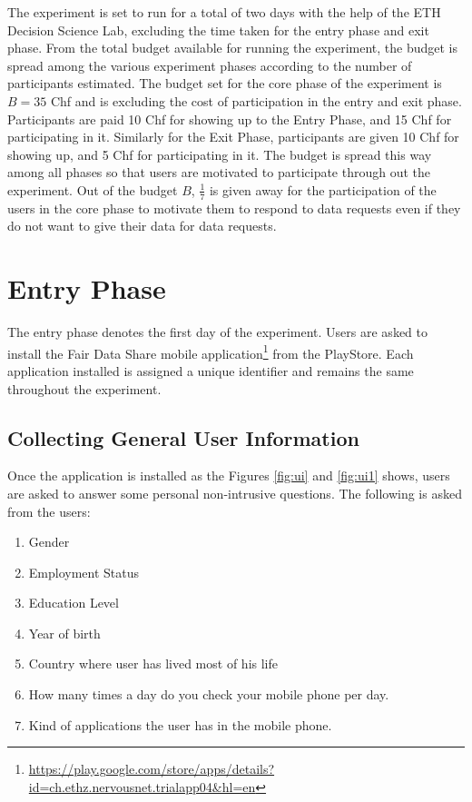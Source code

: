 The experiment is set to run for a total of two days with the help of the ETH Decision Science Lab, excluding the time taken for the entry phase and exit phase. From the total budget available for running the experiment, the budget is spread among the various experiment phases according to the number of participants estimated. The budget set for the core phase of the experiment is $B=35$ Chf and is excluding the cost of participation
in the entry and exit phase. Participants are paid 10 Chf for showing up to the Entry Phase, and 15 Chf for
participating in it. Similarly for the Exit Phase, participants are given 10 Chf for showing up, and 5 Chf for participating in it. The budget is spread this way among all phases so that users are motivated to participate through out the experiment.
Out of the budget $B$, $\frac{1}{7}$ is given away for the participation of the users in the core phase to motivate them to respond to data requests even if they do not want to give their data for data requests. 

\section{Entry Phase}

The entry phase denotes the first day of the experiment. Users are asked to install the Fair Data Share mobile application\footnote{\url{https://play.google.com/store/apps/details?id=ch.ethz.nervousnet.trialapp04&hl=en}} from the PlayStore. Each application installed is assigned a unique identifier and remains the same throughout the experiment. 

\subsection{Collecting General User Information}
Once the application is installed as the Figures \ref{fig:ui} and \ref{fig:ui1} shows, users are asked to answer some personal non-intrusive questions. The following is asked from the users: 
\begin{enumerate}
    \item Gender
    \item Employment Status
    \item Education Level
    \item Year of birth
    \item Country where user has lived most of his life
    \item How many times a day do you check your mobile phone per day.
    \item Kind of applications the user has in the mobile phone.
\end{enumerate}

